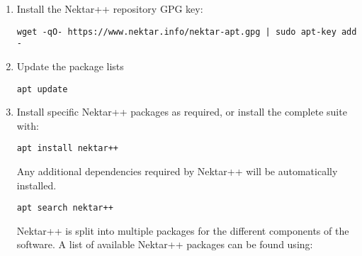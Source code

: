 \begin{enumerate}
    \item Install the Nektar++ repository GPG key:
    \begin{lstlisting}[style=BashInputStyle]
    wget -qO- https://www.nektar.info/nektar-apt.gpg | sudo apt-key add -
    \end{lstlisting}
	\item Update the package lists
	\begin{lstlisting}[style=BashInputStyle]
	apt update
	\end{lstlisting}
	\item Install specific Nektar++ packages as required, or install the complete suite with:
	\begin{lstlisting}[style=BashInputStyle]
	apt install nektar++
	\end{lstlisting}
	Any additional dependencies required by Nektar++ will be automatically installed.
	
    \newsavebox\installationDebTip
    \begin{lrbox}{\installationDebTip}\begin{minipage}{0.8\linewidth}
    \begin{lstlisting}[style=BashInputStyle]
    apt search nektar++
    \end{lstlisting}
    \end{minipage}
    \end{lrbox}
	
	\begin{tipbox}
	Nektar++ is split into multiple packages for the different components of the
	software. A list of available Nektar++ packages can be found using:
	\noindent\usebox\installationDebTip
	\end{tipbox}
\end{enumerate}


